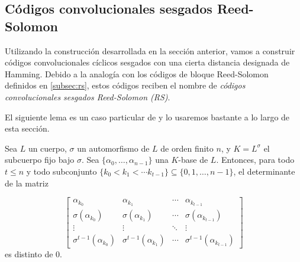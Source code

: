 \subsection{Códigos convolucionales sesgados Reed-Solomon}

Utilizando la construcción desarrollada en la sección anterior, vamos a construir códigos convolucionales cíclicos sesgados con una cierta distancia designada de Hamming. Debido a la analogía con los códigos de bloque Reed-Solomon definidos en \ref{subsec:rs}, estos códigos reciben el nombre de \emph{códigos convolucionales sesgados Reed-Solomon (RS)}. 

El siguiente lema es un caso particular de \cite[Corolario 4.13]{lam1988vandermonde} y lo usaremos bastante a lo largo de esta sección.

\begin{lema}\label{lema:sug}
Sea $L$ un cuerpo, $\sigma$ un automorfismo de $L$ de orden finito $n$, y $K = L^\sigma$ el subcuerpo fijo bajo $\sigma$. Sea $\{\alpha_0,\dots,\alpha_{n-1}\}$ una $K$-base de $L$. Entonces, para todo $t \leq n$ y todo subconjunto $\{k_0 < k_1 < \cdots k_{t-1}\} \subseteq \{0,1,\dots,n-1\}$, el determinante de la matriz 

\[
\begin{bmatrix}
\alpha_{k_0} & \alpha_{k_1} & \cdots & \alpha_{k_{t-1}} \\
\sigma(\alpha_{k_0}) & \sigma(\alpha_{k_1}) & \cdots & \sigma(\alpha_{k_{t-1}}) \\
\vdots & \vdots & \ddots & \vdots \\
\sigma^{t-1}(\alpha_{k_0}) & \sigma^{t-1}(\alpha_{k_1}) & \cdots & \sigma^{t-1}(\alpha_{k_{t-1}})
\end{bmatrix}
\]
es distinto de $0$.
\end{lema}

